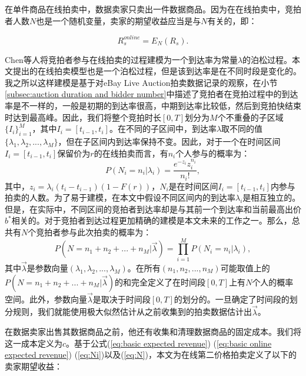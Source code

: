 在单件商品在线拍卖中，数据卖家只卖出一件数据商品。因为在在线拍卖中，竞拍者人数$N$也是一个随机变量，卖家的期望收益应当是与$N$有关的，即：

\begin{equation}
\label{eq:basic online expected revenue}
R_s^{online}=E_N(R_s).
\end{equation}

Chen等人\cite{Chen2007Optimal}将竞拍者参与在线拍卖的过程建模为一个到达率为常量$\lambda$的泊松过程。本文提出的在线拍卖模型也是一个泊松过程，但是该到达率是在不同时段是变化的。我之所以这样建模是基于对eBay Live Auction拍卖数据记录的观察，在小节\ref{subsec:auction duration and bidder number}中描述了竞拍者在竞拍过程中的到达率是不一样的，一般是初期的到达率很高，中期到达率比较低，然后到竞拍快结束时达到最高峰。因此，我们将整个竞拍时长$[0,T]$划分为$M$个不重叠的子区域$\{I_i\}_{i=1}^M$，其中$I_i=[t_{i-1},t_i]$。在不同的子区间中，到达率$\lambda$取不同的值 $\{\lambda_1,\lambda_2,...,\lambda_M\}$，但在子区间内到达率保持不变。因此，对于一个在时间区间$I_i=[t_{i-1},t_i]$保留价为$r$的在线拍卖而言，有$n_i$个人参与的概率为：
\begin{equation}
\label{eq:Ni}
P(N_i=n_i|\lambda_i)=\frac{e^{-z_i}z_i^{n_i}}{n_i!},
\end{equation}
其中，$z_i=\lambda_i(t_i-t_{i-1})(1-F(r))$，$N_i$是在时间区间$I_i=[t_{i-1},t_i]$内参与拍卖的人数。为了易于建模，在本文中假设不同区间内的到达率$\lambda_i$是相互独立的。但是，在实际中，不同区间的竞拍者到达率却是与其前一个到达率和当前最高出价$b^*$相关的。对于竞拍者到达过程更加精确的建模是本文未来的工作之一。那么，总共有$N$个竞拍者参与此次拍卖的概率为：
\begin{equation}
\label{eq:N}
P(N=n_1+n_2+...+n_M|\vec{\lambda})=\prod_{i=1}^{M}P(N_i=n_i|\lambda_i),
\end{equation}
其中$\vec{\lambda}$是参数向量$(\lambda_1,\lambda_2,...,\lambda_M)$。在所有$(n_1,n_2,...,n_M)$可能取值上的$P(N=n_1+n_2+...+n_M|\vec{\lambda})$的和完全定义了在时间段$[0,T]$上有$N$个人的概率空间。此外，参数向量$\vec{\lambda}$是取决于时间段$[0,T]$的划分的。一旦确定了时间段的划分规则，我们就能使用极大似然估计\cite{Bock1982Marginal,Zhou2017An}从之前收集到的拍卖数据估计出$\vec{\lambda}$。

在数据卖家出售其数据商品之前，他还有收集和清理数据商品的固定成本。我们将这一成本定义为$c$。基于公式(\ref{eq:basic expected revenue}) (\ref{eq:basic online expected revenue}) (\ref{eq:Ni})以及(\ref{eq:N})，本文为在线第二价格拍卖定义了以下的卖家期望收益：

